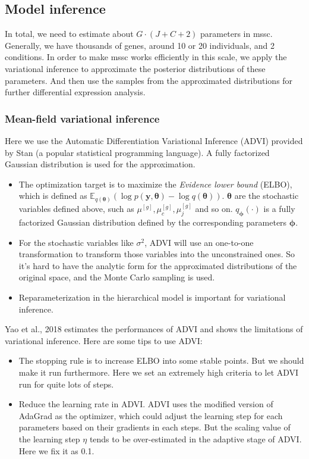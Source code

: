 \documentclass[fleqn,10pt]{wlscirep}
\newcommand{\myvec}[1]{\boldsymbol{#1}}
\newcommand{\mye}{\mathbb{E}}
\begin{document}
\subsection*{Model inference}
In total, we need to estimate about \(G\cdot(J + C + 2)\) parameters in mssc.
Generally, we have thousands of genes, around 10 or 20 individuals, and 2
conditions. In order to make mssc works efficiently in this scale, we apply the
variational inference to approximate the posterior distributions of these
parameters. And then use the samples from the approximated distributions for
further differential expression analysis.

\subsubsection{Mean-field variational inference}

Here we use the Automatic Differentiation Variational Inference (ADVI) provided
by Stan (a popular statistical programming language). A fully
factorized Gaussian distribution is used for the approximation. 

\begin{itemize}
\item
  The optimization target is to maximize the {\it Evidence lower
    bound} 
  (ELBO), which is defined as \(\mye_{q(\myvec{\theta})}\left(\log
    p(\myvec{y},\myvec{\theta}) - \log q(\myvec{\theta})\right)\).
  \(\myvec{\theta}\) are the stochastic variables defined above, such as
  \(\mu^{[g]}, \mu_c^{[g]}, \mu_j^{[g]}\) and so on. \(q_{\myvec{\phi}}(\cdot)\) is a fully
  factorized Gaussian distribution defined by the corresponding parameters
  \(\myvec{\phi}\).
\item
  For the stochastic variables like \(\sigma^2\), ADVI will use an one-to-one
  transformation to transform those variables into the unconstrained ones. So
  it's hard to have the analytic form for the approximated distributions of the
  original space, and the Monte Carlo sampling is used.
\item
  Reparameterization in the hierarchical model is important for variational
  inference.
\end{itemize}

Yao et al., 2018 estimates the performances of ADVI and shows the limitations of
variational inference. Here are some tips to use ADVI:
\begin{itemize}
\item
  The stopping rule is to increase ELBO into some stable points. But we should
  make it run furthermore. Here we set an extremely high criteria to let ADVI
  run for quite lots of steps.
\item
  Reduce the learning rate in ADVI. ADVI uses the modified version of AdaGrad as
  the optimizer, which could adjust the learning step for each parameters based
  on their gradients in each steps. But the
  scaling value of the learning step \(\eta\) tends to be over-estimated in the adaptive
  stage of ADVI. Here we fix it as 0.1.
\end{itemize}
\end{document}
